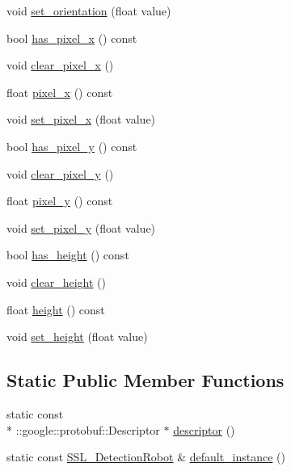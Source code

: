 \begin{DoxyCompactItemize}
\item 
void \hyperlink{class_s_s_l___detection_robot_af363482902c089a742dfdee070e40c90}{set\-\_\-orientation} (float value)
\item 
bool \hyperlink{class_s_s_l___detection_robot_acae3258c0cd82925d17771b7db3ea9f4}{has\-\_\-pixel\-\_\-x} () const 
\item 
void \hyperlink{class_s_s_l___detection_robot_aefd9133018cfdf1efcf0358543878d3c}{clear\-\_\-pixel\-\_\-x} ()
\item 
float \hyperlink{class_s_s_l___detection_robot_af7d95e01dc51fc3a10e1049f6cefd9bd}{pixel\-\_\-x} () const 
\item 
void \hyperlink{class_s_s_l___detection_robot_a90cb179a86632dc0604d4cd2a7acfae8}{set\-\_\-pixel\-\_\-x} (float value)
\item 
bool \hyperlink{class_s_s_l___detection_robot_a8e9468a2315b05731e0d37f496b3ef47}{has\-\_\-pixel\-\_\-y} () const 
\item 
void \hyperlink{class_s_s_l___detection_robot_af16e065c50a9e15482c6844e0475fff6}{clear\-\_\-pixel\-\_\-y} ()
\item 
float \hyperlink{class_s_s_l___detection_robot_a35b7ee812ade11a188742037c361a2b8}{pixel\-\_\-y} () const 
\item 
void \hyperlink{class_s_s_l___detection_robot_a07e44913dcd3e572ea837d436410967e}{set\-\_\-pixel\-\_\-y} (float value)
\item 
bool \hyperlink{class_s_s_l___detection_robot_a7da1b7dd7a8ceb766ec818d318796bac}{has\-\_\-height} () const 
\item 
void \hyperlink{class_s_s_l___detection_robot_a23a9fb8f533b2920aad3ebfc0929315d}{clear\-\_\-height} ()
\item 
float \hyperlink{class_s_s_l___detection_robot_a27c206ebea25f23efa8d366569f60c96}{height} () const 
\item 
void \hyperlink{class_s_s_l___detection_robot_a16404a7c438f0717c12dbed6c03678bc}{set\-\_\-height} (float value)
\end{DoxyCompactItemize}
\subsection*{Static Public Member Functions}
\begin{DoxyCompactItemize}
\item 
static const \\*
\-::google\-::protobuf\-::\-Descriptor $\ast$ \hyperlink{class_s_s_l___detection_robot_aa6358001e4e9ba214b230dd221e5ebf0}{descriptor} ()
\item 
static const \hyperlink{class_s_s_l___detection_robot}{S\-S\-L\-\_\-\-Detection\-Robot} \& \hyperlink{class_s_s_l___detection_robot_aa7d5e1823e36b317dfdff4ce5c8e4a15}{default\-\_\-instance} ()
\end{DoxyCompactItemize}
